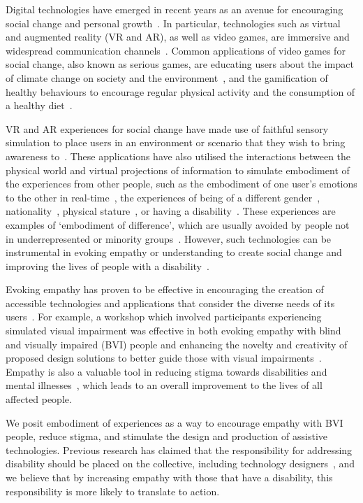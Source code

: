 \documentclass{vgtc}                          %
\begin{document}
Digital technologies have emerged in recent years as an avenue for encouraging social change and personal growth~\cite{empathyLitReview}. In particular, technologies such as virtual and augmented reality (VR and AR), as well as video games, are immersive and widespread communication channels~\cite{sherman2018understanding}. Common applications of video games for social change, also known as serious games, are educating users about the impact of climate change on society and the environment~\cite{flood2018adaptive}, 
and the gamification of healthy behaviours to encourage regular physical activity and the consumption of a healthy diet~\cite{ma2014future}. 

VR and AR experiences for social change have made use of faithful sensory simulation to place users in an environment or scenario that they wish to bring awareness to~\cite{kandaurova2019effects}. These applications have also utilised the interactions between the physical world and virtual projections of information to simulate embodiment of the experiences from other people, such as the embodiment of one user's emotions to the other in real-time~\cite{semertzidis2020neo}, the experiences of being of a different gender~\cite{yee2011men}, nationality~\cite{groom2009influence}, physical stature~\cite{yee2007proteus}, or having a disability~\cite{bacchus2019life, calepso2020, Guarese:Xchange, guareseEmpathy:2021}. These experiences are examples of `embodiment of difference', which are usually avoided by people not in underrepresented or minority groups~\cite{riley2013island}. However, such technologies can be instrumental in evoking empathy or understanding to create social change and improving the lives of people with a disability~\cite{empathyLitReview}.

Evoking empathy has proven to be effective in encouraging the creation of accessible technologies and applications that consider the diverse needs of its users~\cite{raviselvam2021simulation}. For example, a workshop which involved participants experiencing simulated visual impairment was effective in both evoking empathy with blind and visually impaired (BVI) people and enhancing the novelty and creativity of proposed design solutions to better guide those with visual impairments~\cite{raviselvam2016user}. Empathy is also a valuable tool in reducing stigma towards disabilities and mental illnesses~\cite{chowdhury2019vr, ando2011simulation, penn2010virtual}, which leads to an overall improvement to the lives of all affected people.

We posit embodiment of experiences as a way to encourage empathy with BVI people, reduce stigma, and stimulate the design and production of assistive technologies. Previous research has claimed that the responsibility for addressing disability should be placed on the collective, including technology designers~\cite{Thieme2018, Branham:2015}, and we believe that by increasing empathy with those that have a disability, this responsibility is more likely to translate to action. 
\end{document}

